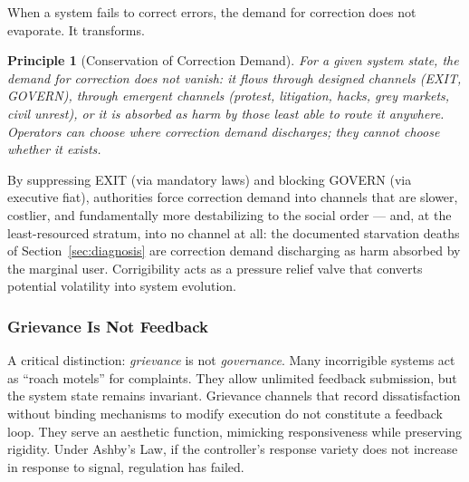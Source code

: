 \documentclass{article}
\newtheorem{principle}{Principle}[section]
\begin{document}
When a system fails to correct errors, the demand for correction does not evaporate. It transforms.

\begin{principle}[Conservation of Correction Demand]
For a given system state, the demand for correction does not vanish: it flows through designed channels (EXIT, GOVERN), through emergent channels (protest, litigation, hacks, grey markets, civil unrest), or it is absorbed as harm by those least able to route it anywhere. Operators can choose \textit{where} correction demand discharges; they cannot choose \textit{whether} it exists.
\end{principle}

By suppressing EXIT (via mandatory laws) and blocking GOVERN (via executive fiat), authorities force correction demand into channels that are slower, costlier, and fundamentally more destabilizing to the social order --- and, at the least-resourced stratum, into no channel at all: the documented starvation deaths of Section~\ref{sec:diagnosis} are correction demand discharging as harm absorbed by the marginal user. Corrigibility acts as a pressure relief valve that converts potential volatility into system evolution.

\subsubsection{Grievance Is Not Feedback}
\label{subsec:grievance}

A critical distinction: \textit{grievance} is not \textit{governance}. Many incorrigible systems act as ``roach motels'' for complaints. They allow unlimited feedback submission, but the system state remains invariant. Grievance channels that record dissatisfaction without binding mechanisms to modify execution do not constitute a feedback loop. They serve an aesthetic function, mimicking responsiveness while preserving rigidity. Under Ashby's Law, if the controller's response variety does not increase in response to signal, regulation has failed.
\end{document}
